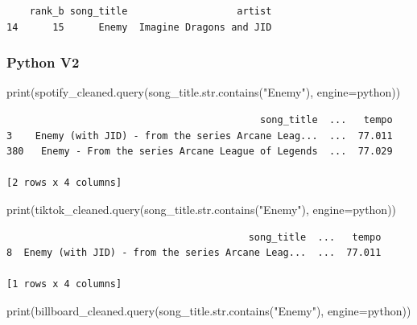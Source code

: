 \documentclass[
  letterpaper,
  DIV=11,
  numbers=noendperiod]{scrreprt}
\newenvironment{Shaded}{\begin{snugshade}}{\end{snugshade}}
\newcommand{\BuiltInTok}[1]{\textcolor[rgb]{0.00,0.23,0.31}{#1}}
\newcommand{\NormalTok}[1]{\textcolor[rgb]{0.00,0.23,0.31}{#1}}
\newcommand{\OperatorTok}[1]{\textcolor[rgb]{0.37,0.37,0.37}{#1}}
\newcommand{\StringTok}[1]{\textcolor[rgb]{0.13,0.47,0.30}{#1}}
\begin{document}
\begin{verbatim}
    rank_b song_title                   artist
14      15      Enemy  Imagine Dragons and JID
\end{verbatim}

\subsubsection{Python V2}

\begin{Shaded}
\begin{Highlighting}[]
\BuiltInTok{print}\NormalTok{(spotify\_cleaned.query(}\StringTok{\textquotesingle{}song\_title.str.contains("Enemy")\textquotesingle{}}\NormalTok{, engine}\OperatorTok{=}\StringTok{\textquotesingle{}python\textquotesingle{}}\NormalTok{))}
\end{Highlighting}
\end{Shaded}

\begin{verbatim}
                                            song_title  ...   tempo
3    Enemy (with JID) - from the series Arcane Leag...  ...  77.011
380   Enemy - From the series Arcane League of Legends  ...  77.029

[2 rows x 4 columns]
\end{verbatim}

\begin{Shaded}
\begin{Highlighting}[]
\BuiltInTok{print}\NormalTok{(tiktok\_cleaned.query(}\StringTok{\textquotesingle{}song\_title.str.contains("Enemy")\textquotesingle{}}\NormalTok{, engine}\OperatorTok{=}\StringTok{\textquotesingle{}python\textquotesingle{}}\NormalTok{))}
\end{Highlighting}
\end{Shaded}

\begin{verbatim}
                                          song_title  ...   tempo
8  Enemy (with JID) - from the series Arcane Leag...  ...  77.011

[1 rows x 4 columns]
\end{verbatim}

\begin{Shaded}
\begin{Highlighting}[]
\BuiltInTok{print}\NormalTok{(billboard\_cleaned.query(}\StringTok{\textquotesingle{}song\_title.str.contains("Enemy")\textquotesingle{}}\NormalTok{, engine}\OperatorTok{=}\StringTok{\textquotesingle{}python\textquotesingle{}}\NormalTok{))}
\end{Highlighting}
\end{Shaded}
\end{document}
